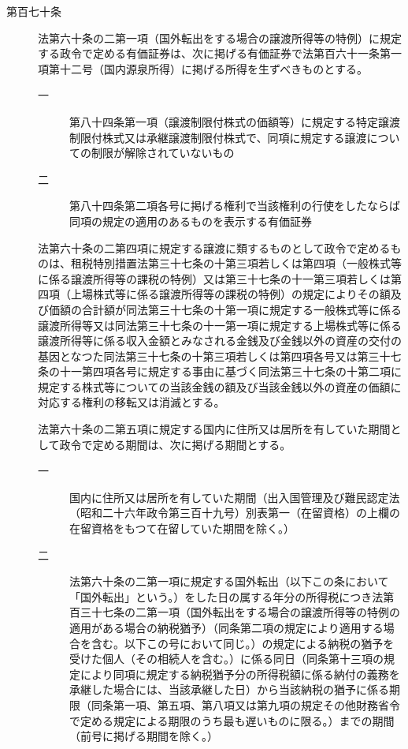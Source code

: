 \documentclass[twocolumn,a4j,10pt]{ltjtarticle}
\begin{document}
\begin{description}
\item[第百七十条]法第六十条の二第一項（国外転出をする場合の譲渡所得等の特例）に規定する政令で定める有価証券は、次に掲げる有価証券で法第百六十一条第一項第十二号（国内源泉所得）に掲げる所得を生ずべきものとする。
\begin{description}
\item[一]第八十四条第一項（譲渡制限付株式の価額等）に規定する特定譲渡制限付株式又は承継譲渡制限付株式で、同項に規定する譲渡についての制限が解除されていないもの
\item[二]第八十四条第二項各号に掲げる権利で当該権利の行使をしたならば同項の規定の適用のあるものを表示する有価証券
\end{description}
\item[]法第六十条の二第四項に規定する譲渡に類するものとして政令で定めるものは、租税特別措置法第三十七条の十第三項若しくは第四項（一般株式等に係る譲渡所得等の課税の特例）又は第三十七条の十一第三項若しくは第四項（上場株式等に係る譲渡所得等の課税の特例）の規定によりその額及び価額の合計額が同法第三十七条の十第一項に規定する一般株式等に係る譲渡所得等又は同法第三十七条の十一第一項に規定する上場株式等に係る譲渡所得等に係る収入金額とみなされる金銭及び金銭以外の資産の交付の基因となつた同法第三十七条の十第三項若しくは第四項各号又は第三十七条の十一第四項各号に規定する事由に基づく同法第三十七条の十第二項に規定する株式等についての当該金銭の額及び当該金銭以外の資産の価額に対応する権利の移転又は消滅とする。
\item[]法第六十条の二第五項に規定する国内に住所又は居所を有していた期間として政令で定める期間は、次に掲げる期間とする。
\begin{description}
\item[一]国内に住所又は居所を有していた期間（出入国管理及び難民認定法（昭和二十六年政令第三百十九号）別表第一（在留資格）の上欄の在留資格をもつて在留していた期間を除く。）
\item[二]法第六十条の二第一項に規定する国外転出（以下この条において「国外転出」という。）をした日の属する年分の所得税につき法第百三十七条の二第一項（国外転出をする場合の譲渡所得等の特例の適用がある場合の納税猶予）（同条第二項の規定により適用する場合を含む。以下この号において同じ。）の規定による納税の猶予を受けた個人（その相続人を含む。）に係る同日（同条第十三項の規定により同項に規定する納税猶予分の所得税額に係る納付の義務を承継した場合には、当該承継した日）から当該納税の猶予に係る期限（同条第一項、第五項、第八項又は第九項の規定その他財務省令で定める規定による期限のうち最も遅いものに限る。）までの期間（前号に掲げる期間を除く。）

\end{description}
\end{description}
\end{document}
